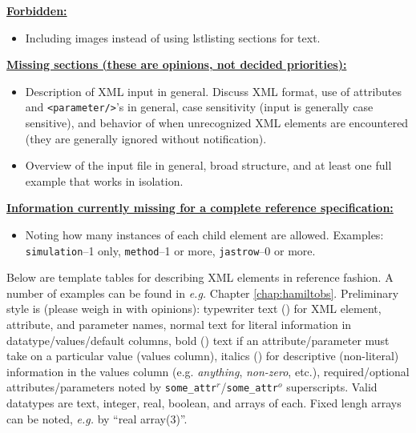 \textbf{\underline{Forbidden:}}
\begin{itemize}
\item Including images instead of using lstlisting sections for text.
\end{itemize}


\textbf{\underline{Missing sections (these are opinions, not decided priorities):}}
\begin{itemize}
  \item{Description of XML input in general.  Discuss XML format, use of attributes and \texttt{<parameter/>}'s in general, case sensitivity (input is generally case sensitive), and behavior of \qmcpack when unrecognized XML elements are encountered (they are generally ignored without notification).}
  \item{Overview of the input file in general, broad structure, and at least one full example that works in isolation.}
\end{itemize}


\textbf{\underline{Information currently missing for a complete reference specification:}}
\begin{itemize}
  \item{Noting how many instances of each child element are allowed.  Examples: \texttt{simulation}--1 only, \texttt{method}--1 or more, \texttt{jastrow}--0 or more}.
\end{itemize}


Below are template tables for describing XML elements in reference fashion.  A number of examples can be found in \textit{e.g.} Chapter \ref{chap:hamiltobs}.  Preliminary style is (please weigh in with opinions): typewriter text (\ilatex{\\texttt\{\}}) for XML element, attribute, and parameter names, normal text for literal information in datatype/values/default columns, bold (\ilatex{\\textbf\{\}}) text if an attribute/parameter must take on a particular value (values column), italics (\ilatex{\\textit\{\}}) for descriptive (non-literal) information in the values column (e.g. \textit{anything}, \textit{non-zero}, etc.), required/optional attributes/parameters noted by \texttt{some\_attr$^r$}/\texttt{some\_attr$^o$} superscripts.  Valid datatypes are text, integer, real, boolean, and arrays of each.  Fixed lengh arrays can be noted, \textit{e.g.} by ``real array(3)''.


